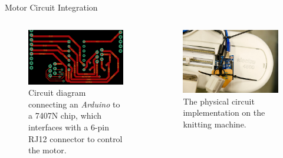 \documentclass[
    NAME={Dr. Helga Ingimundardóttir},
    EMAIL={helgaingim@hi.is},
    FACULTY={Industrial Engineering},
    TITLE={HiDef Textiles: Reviving Tradition with Innovation},
    SUBTITLE={Empowering Creativity and Sustainability in Textile Production through Digital Transformation},
    SEMINAR={Reykjavík DataBeers},
    DATE={January 25, 2025},
    WIDE={true}
]{HI-LaTeX/hi-beamer}
\begin{document}
\begin{frame}{Motor Circuit Integration}
    \begin{columns}
        \begin{column}{0.5\textwidth}
            \begin{figure}
                \centering
                \includegraphics[width=0.9\linewidth]{include/PASSAPMOTOR.png}
                \caption{Circuit diagram connecting an \textit{Arduino} to a 7407N chip, which interfaces with a 6-pin RJ12 connector to control the motor.}
            \end{figure}
        \end{column}
        \begin{column}{0.5\textwidth}
            \begin{figure}
                \centering
                \includegraphics[width=0.9\linewidth]{include/electra4600.jpg}
                \caption{The physical circuit implementation on the knitting machine.}
            \end{figure}
        \end{column}
    \end{columns}
\end{frame}
\end{document}
